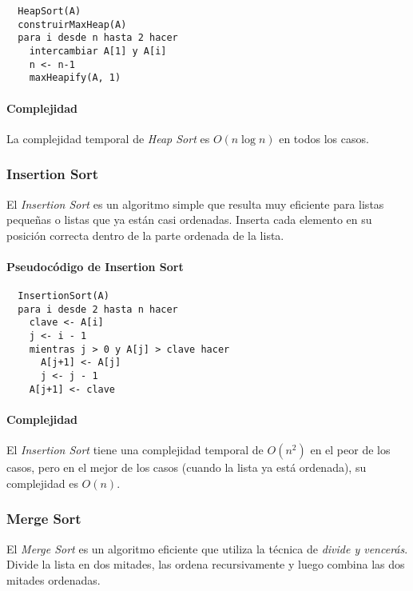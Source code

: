 \begin{verbatim}
  HeapSort(A)
  construirMaxHeap(A)
  para i desde n hasta 2 hacer
    intercambiar A[1] y A[i]
    n <- n-1
    maxHeapify(A, 1)
\end{verbatim}

\paragraph{Complejidad}

La complejidad temporal de \textit{Heap Sort} es \( O(n \log n) \) en todos los casos.

\subsubsection{Insertion Sort}

El \textit{Insertion Sort} es un algoritmo simple que resulta muy eficiente para listas pequeñas o listas que ya están casi ordenadas. Inserta cada elemento en su posición correcta dentro de la parte ordenada de la lista.

\paragraph{Pseudocódigo de Insertion Sort}

\begin{verbatim}
  InsertionSort(A)
  para i desde 2 hasta n hacer
    clave <- A[i]
    j <- i - 1
    mientras j > 0 y A[j] > clave hacer
      A[j+1] <- A[j]
      j <- j - 1
    A[j+1] <- clave
\end{verbatim}

\paragraph{Complejidad}

El \textit{Insertion Sort} tiene una complejidad temporal de \( O(n^2) \) en el peor de los casos, pero en el mejor de los casos (cuando la lista ya está ordenada), su complejidad es \( O(n) \).

\subsubsection{Merge Sort}

El \textit{Merge Sort} es un algoritmo eficiente que utiliza la técnica de \textit{divide y vencerás}. Divide la lista en dos mitades, las ordena recursivamente y luego combina las dos mitades ordenadas.

